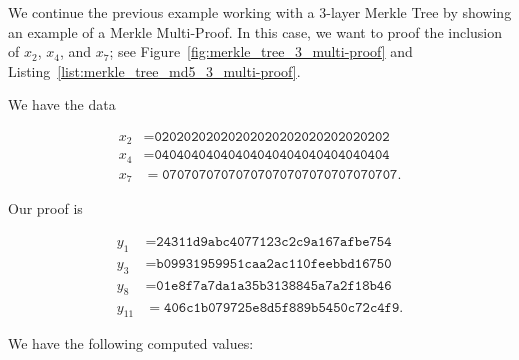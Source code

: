 \begin{example}
\label{example:hash_app_merkle_tree_multi-proof}

We continue the previous example working with a 3-layer Merkle Tree
by showing an example of a Merkle Multi-Proof.
In this case, we want to proof the inclusion of
$x_{2}$, $x_{4}$, and $x_{7}$;
see Figure~\ref{fig:merkle_tree_3_multi-proof}
and Listing~\ref{list:merkle_tree_md5_3_multi-proof}.




We have the data

\begin{align}
    x_{2} &= \texttt{02020202020202020202020202020202}
        \nonumber\\
    x_{4} &= \texttt{04040404040404040404040404040404}
        \nonumber\\
    x_{7} &= \texttt{07070707070707070707070707070707}.
\end{align}

\noindent
Our proof is

\begin{align}
    y_{1}  &= \texttt{24311d9abc4077123c2c9a167afbe754}
        \nonumber\\
    y_{3}  &= \texttt{b09931959951caa2ac110feebbd16750}
        \nonumber\\
    y_{8}  &= \texttt{01e8f7a7da1a35b3138845a7a2f18b46}
        \nonumber\\
    y_{11} &= \texttt{406c1b079725e8d5f889b5450c72c4f9}.
\end{align}

\noindent
We have the following computed values:


\end{example}
